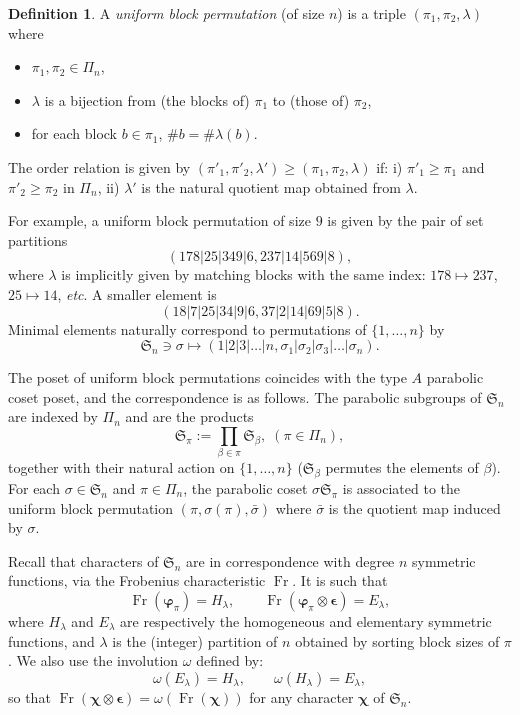 \documentclass[11pt]{article}
\theoremstyle{definition}
\newtheorem{defi}[theo]{Definition}
\DeclareMathOperator{\Fr}{Fr}
\newcommand{\bchi}{\boldsymbol{\chi}}
\newcommand{\bphi}{\boldsymbol{\varphi}}
\newcommand{\bepsilon}{\boldsymbol{\epsilon}}
\begin{document}
\begin{defi}
    A {\it uniform block permutation} (of size $n$) is a triple $(\pi_1,\pi_2,\lambda)$ where
    \begin{itemize}
        \item $\pi_1, \pi_2 \in \Pi_n$,
        \item $\lambda$ is a bijection from (the blocks of) $\pi_1$ to (those of) $\pi_2$,
        \item for each block $b\in \pi_1$, $\# b = \# \lambda(b)$.  
    \end{itemize}
    The order relation is given by $(\pi'_1,\pi'_2,\lambda') \geq (\pi_1,\pi_2,\lambda)$ if: i) $\pi'_1 \geq \pi_1$ and $\pi'_2 \geq \pi_2$ in $\Pi_n$, ii) $\lambda'$ is the natural quotient map obtained from $\lambda$.
\end{defi}

For example, a uniform block permutation of size $9$ is given by the pair of set partitions
\[
    (178|25|349|6, 237|14|569|8),
\]
where $\lambda$ is implicitly given by matching blocks with the same index: $178\mapsto 237$, $25 \mapsto 14$, {\it etc}. A smaller element is
\[
    (18|7|25|34|9|6, 
     37|2|14|69|5|8).
\]
Minimal elements naturally correspond to permutations of $\{1,\dots,n\}$ by 
\[
    \mathfrak{S}_n \owns \sigma 
        \mapsto
    (1|2|3|\dots |n, \sigma_1 | \sigma_2 | \sigma_3 | \dots |\sigma_n).
\]

The poset of uniform block permutations coincides with the type $A$ parabolic coset poset, and the correspondence is as follows.  The parabolic subgroups of  $\mathfrak{S}_n$ are indexed by $\Pi_n$ and are the products
\[
    \mathfrak{S}_\pi := \prod_{\beta \in \pi} \mathfrak{S}_{\beta}, \; (\pi\in \Pi_n),
\]
together with their natural action on $\{1,\dots,n\}$ ($\mathfrak{S}_{\beta}$ permutes the elements of $\beta$).  For each $\sigma \in \mathfrak{S}_n$ and $\pi \in \Pi_n$, the parabolic coset $\sigma \mathfrak{S}_\pi$ is associated to the uniform block permutation $(\pi,\sigma(\pi), \bar\sigma)$ where $\bar\sigma$ is the quotient map induced by $\sigma$.  

Recall that characters of $\mathfrak{S}_n$ are in correspondence with degree $n$ symmetric functions, via the Frobenius characteristic $\Fr$.  It is such 
that
\[
    \Fr( \bphi_\pi ) = H_\lambda, 
        \qquad
    \Fr( \bphi_\pi \otimes \bepsilon ) = E_\lambda,
\]
where $H_\lambda$ and $E_\lambda$ are respectively the homogeneous and elementary symmetric functions, and $\lambda$ is the (integer) partition of $n$ obtained by sorting block sizes of $\pi$.  We also use the involution $\omega$ defined by:
\[
    \omega( E_\lambda ) = H_\lambda, \qquad
    \omega( H_\lambda ) = E_\lambda,
\]
so that $\Fr(\bchi \otimes \bepsilon) = \omega( \Fr(\bchi) )$ for any character $\bchi$ of $\mathfrak{S}_n$.
\end{document}
